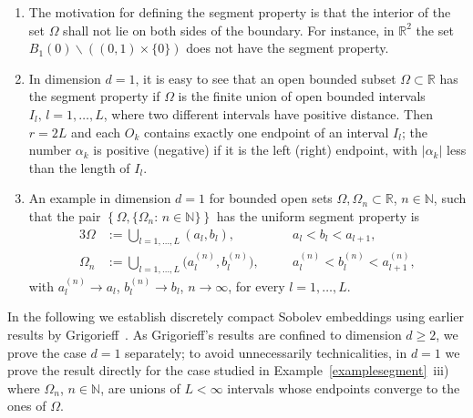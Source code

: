 \documentclass[a4paper,reqno]{amsart}
\begin{document}
\begin{example}\label{examplesegment}
 \begin{enumerate}[label=\rm{\roman{*})}]
  \item The motivation for defining the segment property is that the interior of the set $\Omega$ shall not lie on both sides of the boundary. For instance, in ${\mathbb{R}}^2$ the set $B_1(0)\backslash \left((0,1)\times \{0\}\right)$ does not have the segment property.
  \item In dimension $d=1$, it is easy to see that an open bounded subset $\Omega\subset{\mathbb{R}}$ has the segment property if $\Omega$ is the finite union of open bounded intervals $I_l, \,l=1,\dots,L$, where two different intervals have positive distance.
Then $r=2L$ and each $O_k$ contains exactly one endpoint of an interval $I_l$; the number $\alpha_k$ is positive (negative) if it is the left (right) endpoint, with $|\alpha_k|$ less than the length of $I_l$.
 \item An example in dimension $d=1$ for bounded open sets $\Omega,\Omega_n\subset{\mathbb{R}}$, $n\in{\mathbb{N}}$, such that the pair $\left\{\Omega, \{\Omega_n:\,n\in{\mathbb{N}}\}\right\}$ has the uniform segment property is
\begin{alignat*}{3}
 \Omega&:=\underset{l=1,\dots,L}{\bigcup}(a_l,b_l), \quad &&a_l<b_l<a_{l+1},\\
 \Omega_n&:=\underset{l=1,\dots,L}{\bigcup}\big(a_l^{(n)},b_l^{(n)}\big), \quad &&a_l^{(n)}<b_l^{(n)}<a_{l+1}^{(n)},
\end{alignat*}
with $a_l^{(n)}\to a_l$, $b_l^{(n)}\to b_l$, $n\to\infty$, for every $l=1,\dots,L$.
 \end{enumerate}
\end{example}

In the following we establish discretely compact Sobolev embeddings using earlier results 
by Grigorieff~\cite{grigorieffsobolev}. 
As Grigorieff's results are confined to dimension $d\geq 2$, we prove the case $d=1$ separately; to avoid unnecessarily technicalities, in $d=1$ we prove the result directly for the case studied in 
Example~\ref{examplesegment}~iii) where $\Omega_n$, $n\in{\mathbb{N}}$, are unions of $L<\infty$ intervals whose endpoints converge to the ones of $\Omega$.
\end{document}
